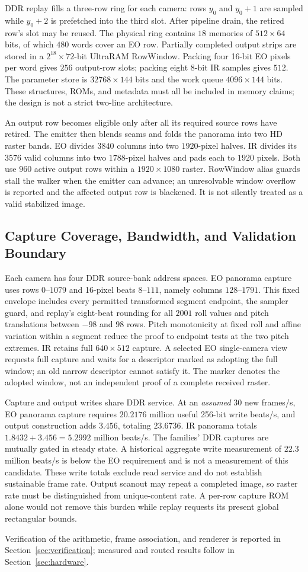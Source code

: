 DDR replay fills a three-row ring for each camera: rows $y_0$ and $y_0+1$
are sampled while $y_0+2$ is prefetched into the third slot. After pipeline
drain, the retired row's slot may be reused. The physical ring contains
$18$ memories of $512\times64$ bits, of which $480$ words cover an EO row.
Partially completed output strips are stored in a $2^{18}\times72$-bit
UltraRAM RowWindow. Packing four 16-bit EO pixels per word gives $256$
output-row slots; packing eight 8-bit IR samples gives $512$. The parameter
store is $32768\times144$ bits and the work queue $4096\times144$ bits.
These structures, ROMs, and metadata must all be included in memory claims;
the design is not a strict two-line architecture.

An output row becomes eligible only after all its required source rows
have retired. The emitter then blends seams and folds the panorama into
two HD raster bands. EO divides $3840$ columns into two $1920$-pixel halves.
IR divides its $3576$ valid columns into two $1788$-pixel halves and pads
each to $1920$ pixels. Both use $960$ active output rows within a
$1920\times1080$ raster. RowWindow alias guards stall the walker when the
emitter can advance; an unresolvable window overflow is reported and the
affected output row is blackened. It is not silently treated as a valid
stabilized image.

\subsection{Capture Coverage, Bandwidth, and Validation Boundary}
Each camera has four DDR source-bank address spaces. EO panorama capture
uses rows $0$--$1079$ and 16-pixel beats $8$--$111$, namely columns
$128$--$1791$. This fixed envelope includes every permitted transformed
segment endpoint, the sampler guard, and replay's eight-beat rounding for
all $2001$ roll values and pitch translations between $-98$ and $98$ rows.
Pitch monotonicity at fixed roll and affine variation within a segment
reduce the proof to endpoint tests at the two pitch extremes. IR retains
full $640\times512$ capture. A selected EO single-camera view requests full
capture and waits for a descriptor marked as adopting the full window;
an old narrow descriptor cannot satisfy it. The marker denotes the adopted
window, not an independent proof of a complete received raster.

Capture and output writes share DDR service. At an \emph{assumed} $30$
new frames/s, EO panorama capture requires $20.2176$ million useful
256-bit write beats/s, and output construction adds $3.456$, totaling
$23.6736$. IR panorama totals $1.8432+3.456=5.2992$ million beats/s.
The families' DDR captures are mutually gated in steady state. A historical
aggregate write measurement of $22.3$ million beats/s is below the EO
requirement and is not a measurement of this candidate. These write totals
exclude read service and do not establish sustainable frame rate. Output
scanout may repeat a completed image, so raster rate must be distinguished
from unique-content rate. A per-row capture ROM alone would not remove
this burden while replay requests its present global rectangular bounds.

Verification of the arithmetic, frame association, and renderer is reported in
Section~\ref{sec:verification}; measured and routed results follow in
Section~\ref{sec:hardware}.
